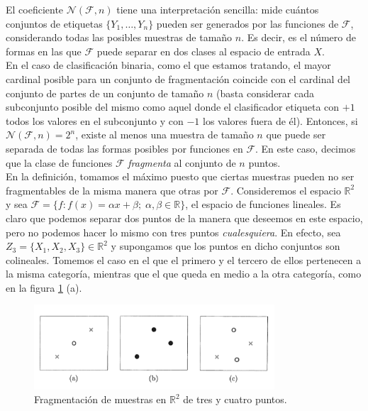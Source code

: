 \documentclass{article}
\begin{document}
El coeficiente $\mathcal{N}(\mathcal{F}, n)$ tiene una interpretación sencilla: mide cuántos conjuntos de etiquetas 
\( \{Y_1, \dots, Y_n\} \) pueden ser generados por las funciones de \(\mathcal{F}\), considerando todas las posibles
muestras de tamaño \(n\). Es decir, es el número de formas en las que \(\mathcal{F}\) puede separar en dos clases al 
espacio de entrada $X$.\\

En el caso de clasificación binaria, como el que estamos tratando, el mayor cardinal posible para un conjunto de fragmentación
coincide con el cardinal del conjunto de partes de un conjunto de tamaño $n$ (basta considerar cada subconjunto posible del mismo
como aquel donde el clasificador etiqueta con $+1$ todos los valores en el subconjunto y con $-1$ los valores fuera de él). Entonces,
si \(\mathcal{N}(\mathcal{F}, n) = 2^n\), existe al menos una muestra de tamaño \(n\) que puede ser separada 
de todas las formas posibles por funciones en \(\mathcal{F}\). En este caso, decimos que la clase de funciones 
\(\mathcal{F}\) \textit{fragmenta} al conjunto de \(n\) puntos. \\

En la definición, tomamos el máximo puesto que ciertas muestras pueden no ser fragmentables de la misma manera que otras por \(\mathcal{F}\). 
Consideremos el espacio $\mathbb{R}^2$ y sea $\mathcal{F}=\{f: f(x)= \alpha x + \beta; \; \alpha, \beta\in\mathbb{R}\}$, el espacio
de funciones lineales.
Es claro que podemos separar dos puntos de la manera que deseemos en este espacio, pero no podemos hacer lo mismo con tres puntos \textit{cualesquiera}.
En efecto, sea $Z_3 = \{X_1,X_2,X_3\} \in \mathbb{R}^2$ y supongamos que los puntos en dicho conjuntos son colineales. Tomemos el caso en el que el primero y el tercero de ellos pertenecen a la misma categoría,
mientras que el que queda en medio a la otra categoría, como en la figura \ref{fragmentacion perceptron} (a). 

\begin{figure}[h]
    \centering
    \includegraphics[width=0.8\textwidth]{Images/5.png}
    
    \caption{Fragmentación de muestras en $\mathbb{R}^2$ de tres y cuatro puntos.}
    \label{fragmentacion perceptron}
    \end{figure}
\end{document}
